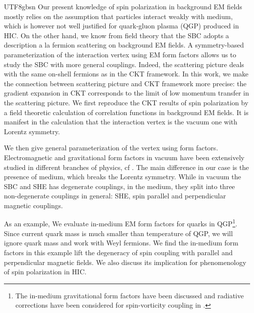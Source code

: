 \documentclass[11pt]{article}\def\baselinestretch{1.4}
\begin{document}
\begin{CJK}{UTF8}{gbsn}
Our present knowledge of spin polarization in background EM fields mostly relies on the assumption that particles interact weakly with medium, which is however not well justified for quark-gluon plasma (QGP) produced in HIC. On the other hand, we know from field theory that the SBC adopts a description a la fermion scattering on background EM fields. A symmetry-based parameterization of the interaction vertex using EM form factors allows us to study the SBC with more general couplings. Indeed, the scattering picture deals with the same on-shell fermions as in the CKT framework. In this work, we make the connection between scattering picture and CKT framework more precise: the gradient expansion in CKT corresponds to the limit of low momentum transfer in the scattering picture. We first reproduce the CKT results of spin polarization by a field theoretic calculation of correlation functions in background EM fields. It is manifest in the calculation that the interaction vertex is the vacuum one with Lorentz symmetry.



We then give general parameterization of the vertex using form factors.
Electromagnetic and gravitational form factors in vacuum have been extensively studied in different branches of physics, cf \cite{Giunti:2014ixa,Polyakov:2018zvc}. The main difference in our case is the presence of medium, which breaks the Lorentz symmetry. While in vacuum the SBC and SHE has degenerate couplings, in the medium, they split into three non-degenerate couplings in general: SHE, spin parallel and perpendicular magnetic couplings.

As an example, We evaluate in-medium EM form factors for quarks in QGP\footnote{The in-medium gravitational form factors have been discussed and radiative corrections have been considered for spin-vorticity coupling in \cite{Buzzegoli:2021jeh,Lin:2023ass}.}. Since current quark mass is much smaller than temperature of QGP, we will ignore quark mass and work with Weyl fermions. We find the in-medium form factors in this example lift the degeneracy of spin coupling with parallel and perpendicular magnetic fields. We also discuss its implication for phenomenology of spin polarization in HIC.


\end{CJK}
\end{document}
